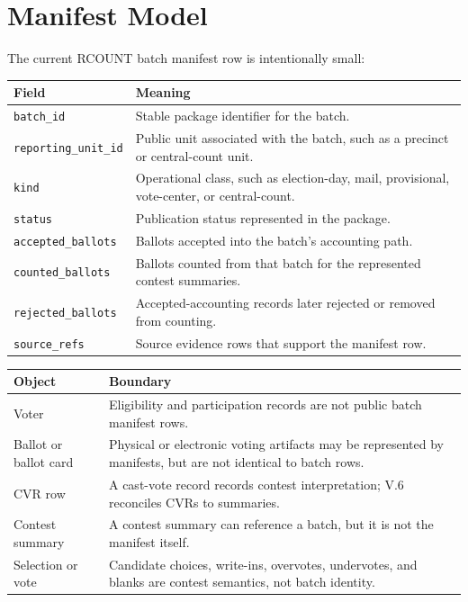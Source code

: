 \section{Manifest Model}

The current RCOUNT batch manifest row is intentionally small:

\begin{center}
\small
\begin{tabularx}{\textwidth}{lX}
\toprule
Field & Meaning \\
\midrule
\texttt{batch\_id} & Stable package identifier for the batch. \\
\texttt{reporting\_unit\_id} & Public unit associated with the batch, such as a precinct or central-count unit. \\
\texttt{kind} & Operational class, such as election-day, mail, provisional, vote-center, or central-count. \\
\texttt{status} & Publication status represented in the package. \\
\texttt{accepted\_ballots} & Ballots accepted into the batch's accounting path. \\
\texttt{counted\_ballots} & Ballots counted from that batch for the represented contest summaries. \\
\texttt{rejected\_ballots} & Accepted-accounting records later rejected or removed from counting. \\
\texttt{source\_refs} & Source evidence rows that support the manifest row. \\
\bottomrule
\end{tabularx}
\end{center}

\begin{center}
\small
\begin{tabularx}{\textwidth}{lX}
\toprule
Object & Boundary \\
\midrule
Voter & Eligibility and participation records are not public batch manifest rows. \\
Ballot or ballot card & Physical or electronic voting artifacts may be represented by manifests, but are not identical to batch rows. \\
CVR row & A cast-vote record records contest interpretation; V.6 reconciles CVRs to summaries. \\
Contest summary & A contest summary can reference a batch, but it is not the manifest itself. \\
Selection or vote & Candidate choices, write-ins, overvotes, undervotes, and blanks are contest semantics, not batch identity. \\
\bottomrule
\end{tabularx}
\end{center}

